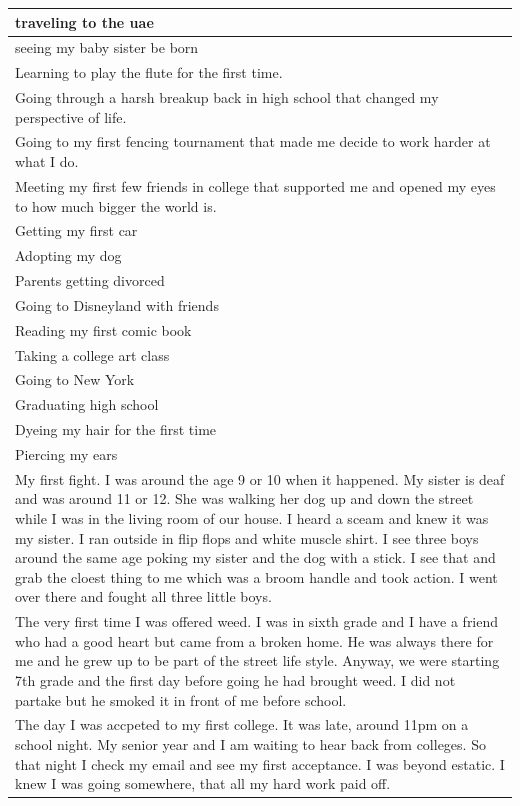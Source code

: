 \documentclass[
  .7em,
  letterpaper,
  DIV=11,
  numbers=noendperiod]{scrartcl}
\begin{document}
\begin{table}
\begin{tabular}{l}
\hline
traveling to the uae\\
\hline
seeing my baby sister be born\\
\hline
Learning to play the flute for the first time.\\
\hline
Going through a harsh breakup back in high school that changed my perspective of life.\\
\hline
Going to my first fencing tournament that made me decide to work harder at what I do.\\
\hline
Meeting my first few friends in college that supported me and opened my eyes to how much bigger the world is.\\
\hline
Getting my first car\\
\hline
Adopting my dog\\
\hline
Parents getting divorced\\
\hline
Going to Disneyland with friends\\
\hline
Reading my first comic book\\
\hline
Taking a college art class\\
\hline
Going to New York\\
\hline
Graduating high school\\
\hline
Dyeing my hair for the first time\\
\hline
Piercing my ears\\
\hline
My first fight. I was around the age 9 or 10 when it happened. My sister is deaf and was around 11 or 12. She was walking her dog up and down the street while I was in the living room of our house. I heard a sceam and knew it was my sister. I ran outside in flip flops and white muscle shirt. I see three boys around the same age poking my sister and the dog with a stick. I see that and grab the cloest thing to me which was a broom handle and took action. I went over there and fought all three little boys.\\
\hline
The very first time I was offered weed. I was in sixth grade and I have a friend who had a good heart but came from a broken home. He was always there for me and he grew up to be part of the street life style. Anyway, we were starting 7th grade and the first day before going he had brought weed. I did not partake but he smoked it in front of me before school.\\
\hline
The day I was accpeted to my first college. It was late, around 11pm on a school night. My senior year and I am waiting to hear back from colleges. So that night I check my email and see my first acceptance. I was beyond estatic. I knew I was going somewhere, that all my hard work paid off.\\

\end{tabular}
\end{table}
\end{document}
